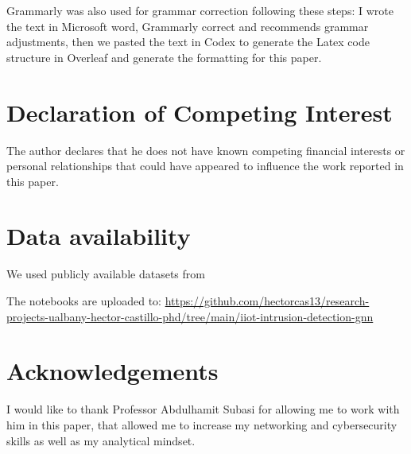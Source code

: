 \documentclass[final,5p,times,twocolumn]{elsarticle}
\begin{document}
Grammarly was also used for grammar correction following these steps: I wrote the text in Microsoft word, Grammarly correct and recommends grammar adjustments, then we pasted the text in Codex to generate the Latex code structure in Overleaf and generate the formatting for this paper.

\section*{Declaration of Competing Interest}
The author declares that he does not have known competing financial interests or personal relationships that could have appeared to influence the work reported in this paper.

\section*{Data availability}
We used publicly available datasets from \citep{unb_iiot_2025}

The notebooks are uploaded to: 
\url{https://github.com/hectorcas13/research-projects-ualbany-hector-castillo-phd/tree/main/iiot-intrusion-detection-gnn}

\section*{Acknowledgements}
I would like to thank Professor Abdulhamit Subasi for allowing me to work with him in this paper, that allowed me to increase my networking and cybersecurity skills as well as my analytical mindset.
 

\end{document}

